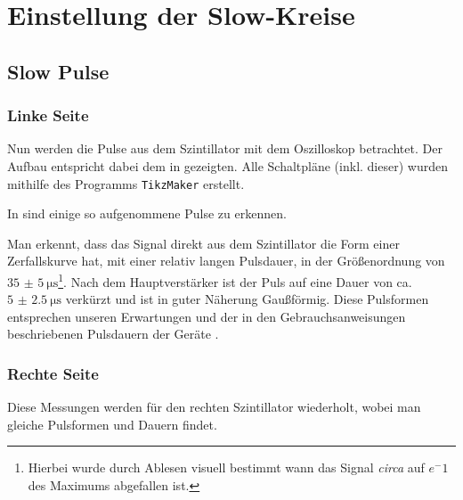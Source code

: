 \chapter{Einstellung der Slow-Kreise}










\section{Slow Pulse}

\subsection*{Linke Seite}



Nun werden die Pulse aus dem Szintillator mit dem Oszilloskop betrachtet. Der Aufbau entspricht dabei dem in  gezeigten. Alle Schaltpläne (inkl. dieser) wurden mithilfe des Programms \texttt{TikzMaker} \cite{tikzmaker} erstellt.


In  sind einige so aufgenommene Pulse zu erkennen.


Man erkennt, dass das Signal direkt aus dem Szintillator die Form einer Zerfallskurve hat, mit einer relativ langen Pulsdauer, in der Größenordnung von $\SI{35(5)}{\micro\second}$\footnote{Hierbei wurde durch Ablesen visuell bestimmt wann das Signal \textit{circa} auf $e^-1$ des Maximums abgefallen ist.}. Nach dem Hauptverstärker ist der Puls auf eine Dauer von ca. $\SI{5(2.5)}{\micro\second}$ verkürzt und ist in guter Näherung Gaußförmig. Diese Pulsformen entsprechen unseren Erwartungen und der in den Gebrauchsanweisungen beschriebenen Pulsdauern der Geräte \cite{pmtmanual} \cite{shaping_amp}.

\subsection*{Rechte Seite}
Diese Messungen werden für den rechten Szintillator wiederholt, wobei man gleiche Pulsformen und Dauern findet.


